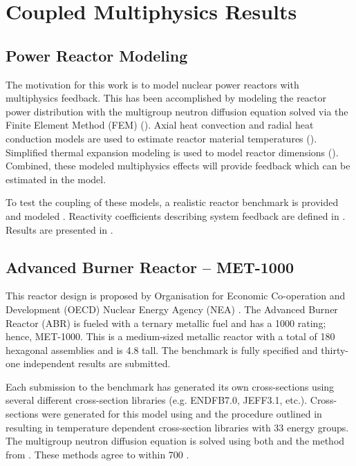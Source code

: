 \chapter{Coupled Multiphysics Results}
\label{ch:coupledResults}

\section{Power Reactor Modeling}
\label{sec:power_reactor_modeling}
  The motivation for this work is to model nuclear power reactors with
  multiphysics feedback. This has been accomplished by modeling the reactor 
  power distribution with the multigroup neutron diffusion equation solved via 
  the Finite Element Method (FEM) (). Axial heat
  convection and radial heat conduction models are used to estimate reactor
  material temperatures ().
  Simplified thermal expansion modeling is used to model reactor dimensions 
  (). Combined, these modeled multiphysics effects 
  will provide feedback which can be estimated in the model. 
  
  To test the coupling of these models, a realistic reactor benchmark is 
  provided and modeled . Reactivity coefficients describing system 
  feedback are defined in . Results are 
  presented in .

\section{Advanced Burner Reactor -- MET-1000}
\label{sec:abr}
  This reactor design is proposed by Organisation for Economic Co-operation and
  Development (OECD) Nuclear Energy Agency (NEA) \cite{abr}. The Advanced
  Burner Reactor (ABR) is fueled with a ternary metallic fuel and has a 1000
   rating; hence, MET-1000. This is a medium-sized metallic reactor 
  with a total of 180 hexagonal assemblies and is 4.8  tall. The 
  benchmark is fully specified and thirty-one independent results are submitted. 
  
  Each submission to the benchmark has generated its own cross-sections using 
  several different cross-section libraries (e.g. ENDFB7.0, JEFF3.1, etc.). 
  Cross-sections were generated for this model using \mcc and the procedure 
  outlined in  resulting in temperature
  dependent cross-section libraries with 33 energy groups. The  multigroup 
  neutron diffusion equation is solved using both \dif and the method from
  . These methods agree to within 700 . 

